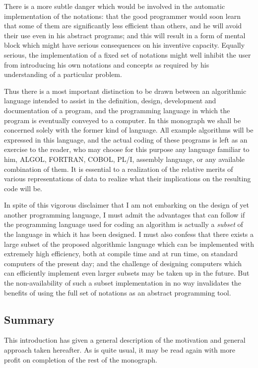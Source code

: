 There is a more subtle danger which would be involved in the automatic implementation of the notations: that the good programmer would soon learn that some of them are significantly less efficient than others, and he will avoid their use even in his abstract programs; and this will result in a form of mental block which might have serious consequences on his inventive capacity. Equally serious, the implementation of a fixed set of notations might well inhibit the user from introducing his own notations and concepts as required by his understanding of a particular problem.

Thus there is a most important distinction to be drawn between an algorithmic language intended to assist in the definition, design, development and documentation of a program, and the programming language in which the program is eventually conveyed to a computer. In this monograph we shall be concerned solely with the former kind of language. All example algorithms will be expressed in this language, and the actual coding of these programs is left as an exercise to the reader, who may choose for this purpose any language familiar to him, ALGOL, FORTRAN, COBOL, PL/I, assembly language, or any available combination of them. It is essential to a realization of the relative merits of various representations of data to realize what their implications on the resulting code will be.

In spite of this vigorous disclaimer that I am not embarking on the design of yet another programming language, I must admit the advantages that can follow if the programming language used for coding an algorithm is actually a \textit{subset} of the language in which it has been designed. I must also confess that there exists a large subset of the proposed algorithmic language which can be implemented with extremely high efficiency, both at compile time and at run time, on standard computers of the present day; and the challenge of designing computers which can efficiently implement even larger subsets may be taken up in the future. But the non-availability of such a subset implementation in no way invalidates the benefits of using the full set of notations as an abstract programming tool.

\subsection{Summary}

This introduction has given a general description of the motivation and general approach taken hereafter. As is quite usual, it may be read again with more profit on completion of the rest of the monograph.

